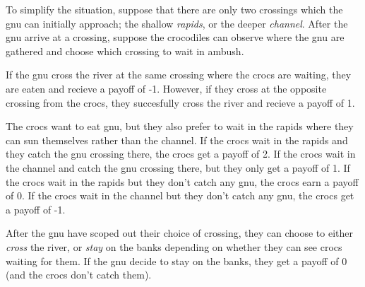 \documentclass[addpoints]{exam}
\begin{document}
\begin{questions}
To simplify the situation, suppose that there are only two crossings which the gnu can initially approach;
the shallow \textit{rapids}, or the deeper \textit{channel}.
After the gnu arrive at a crossing, suppose the crocodiles can observe where the gnu are gathered and choose which crossing to wait in ambush.

If the gnu cross the river at the same crossing where the crocs are waiting, they are eaten and recieve a payoff of -1.
However, if they cross at the opposite crossing from the crocs, they succesfully cross the river and recieve a payoff of 1.

The crocs want to eat gnu, but they also prefer to wait in the rapids where they can sun themselves rather than the channel.
If the crocs wait in the rapids and they catch the gnu crossing there, the crocs get a payoff of 2.
If the crocs wait in the channel and catch the gnu crossing there, but they only get a payoff of 1.
If the crocs wait in the rapids but they don't catch any gnu, the crocs earn a payoff of 0.
If the crocs wait in the channel but they don't catch any gnu, the crocs get a payoff of -1.

After the gnu have scoped out their choice of crossing, they can choose to either \textit{cross} the river, or \textit{stay} on the banks depending on whether they can see crocs waiting for them.
If the gnu decide to stay on the banks, they get a payoff of 0 (and the crocs don't catch them).

\end{questions}
\end{document}
